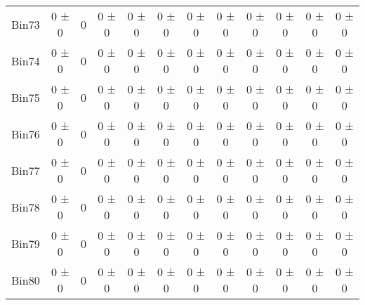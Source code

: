 \begin{tabular}{@{\extracolsep{4pt}}lccccccccccc@{}}
     Bin73 & 0 ± 0 & 0 & 0 ± 0 & 0 ± 0 & 0 ± 0 & 0 ± 0 & 0 ± 0 & 0 ± 0 & 0 ± 0 & 0 ± 0 & 0 ± 0 \\ 
     Bin74 & 0 ± 0 & 0 & 0 ± 0 & 0 ± 0 & 0 ± 0 & 0 ± 0 & 0 ± 0 & 0 ± 0 & 0 ± 0 & 0 ± 0 & 0 ± 0 \\ 
     Bin75 & 0 ± 0 & 0 & 0 ± 0 & 0 ± 0 & 0 ± 0 & 0 ± 0 & 0 ± 0 & 0 ± 0 & 0 ± 0 & 0 ± 0 & 0 ± 0 \\ 
     Bin76 & 0 ± 0 & 0 & 0 ± 0 & 0 ± 0 & 0 ± 0 & 0 ± 0 & 0 ± 0 & 0 ± 0 & 0 ± 0 & 0 ± 0 & 0 ± 0 \\ 
     Bin77 & 0 ± 0 & 0 & 0 ± 0 & 0 ± 0 & 0 ± 0 & 0 ± 0 & 0 ± 0 & 0 ± 0 & 0 ± 0 & 0 ± 0 & 0 ± 0 \\ 
     Bin78 & 0 ± 0 & 0 & 0 ± 0 & 0 ± 0 & 0 ± 0 & 0 ± 0 & 0 ± 0 & 0 ± 0 & 0 ± 0 & 0 ± 0 & 0 ± 0 \\ 
     Bin79 & 0 ± 0 & 0 & 0 ± 0 & 0 ± 0 & 0 ± 0 & 0 ± 0 & 0 ± 0 & 0 ± 0 & 0 ± 0 & 0 ± 0 & 0 ± 0 \\ 
     Bin80 & 0 ± 0 & 0 & 0 ± 0 & 0 ± 0 & 0 ± 0 & 0 ± 0 & 0 ± 0 & 0 ± 0 & 0 ± 0 & 0 ± 0 & 0 ± 0 \\ 
\hline\hline
  \end{tabular}
